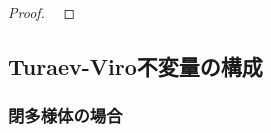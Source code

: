 \documentclass[TQFT_main]{subfiles}
\begin{document}
\begin{proof}
    ~\cite[Theorem 11.5, p.250]{Turaev2017}
\end{proof}




    

\subsection{Turaev-Viro不変量の構成}

\subsubsection{閉多様体の場合}
\end{document}
